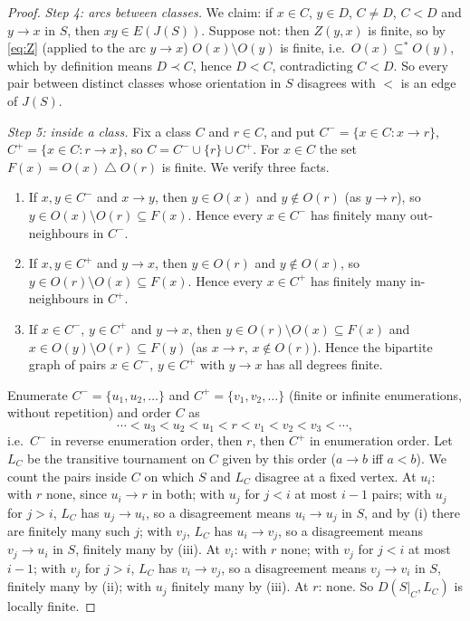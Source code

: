 \documentclass[11pt,a4paper]{article}
\theoremstyle{plain}
\theoremstyle{definition}
\theoremstyle{remark}
\providecommand{\tightlist}{\setlength{\itemsep}{0pt}\setlength{\parskip}{0pt}}
\newcommand{\fin}{\subseteq^{\ast}}
\newcommand{\symdiff}{\mathbin{\triangle}}
\begin{document}
\begin{proof}
\emph{Step 4: arcs between classes.} We claim: if $x\in C$, $y\in D$, $C\ne D$, $C<D$ and $y\to x$ in $S$, then $xy\in E(J(S))$. Suppose not: then $Z(y,x)$ is finite, so by \eqref{eq:Z} (applied to the arc $y\to x$) $O(x)\setminus O(y)$ is finite, i.e.\ $O(x)\fin O(y)$, which by definition means $D\prec C$, hence $D<C$, contradicting $C<D$. So every pair between distinct classes whose orientation in $S$ disagrees with $<$ is an edge of $J(S)$.

\emph{Step 5: inside a class.} Fix a class $C$ and $r\in C$, and put $C^-=\{x\in C: x\to r\}$, $C^+=\{x\in C: r\to x\}$, so $C=C^-\cup\{r\}\cup C^+$. For $x\in C$ the set $F(x)=O(x)\symdiff O(r)$ is finite. We verify three facts.
\begin{enumerate}[label=(\roman*)]\tightlist
\item If $x,y\in C^-$ and $x\to y$, then $y\in O(x)$ and $y\notin O(r)$ (as $y\to r$), so $y\in O(x)\setminus O(r)\subseteq F(x)$. Hence every $x\in C^-$ has finitely many out-neighbours in $C^-$.
\item If $x,y\in C^+$ and $y\to x$, then $y\in O(r)$ and $y\notin O(x)$, so $y\in O(r)\setminus O(x)\subseteq F(x)$. Hence every $x\in C^+$ has finitely many in-neighbours in $C^+$.
\item If $x\in C^-$, $y\in C^+$ and $y\to x$, then $y\in O(r)\setminus O(x)\subseteq F(x)$ and $x\in O(y)\setminus O(r)\subseteq F(y)$ (as $x\to r$, $x\notin O(r)$). Hence the bipartite graph of pairs $x\in C^-$, $y\in C^+$ with $y\to x$ has all degrees finite.
\end{enumerate}
Enumerate $C^-=\{u_1,u_2,\dots\}$ and $C^+=\{v_1,v_2,\dots\}$ (finite or infinite enumerations, without repetition) and order $C$ as
\begin{equation}\label{eq:classorder}
 \cdots<u_3<u_2<u_1<r<v_1<v_2<v_3<\cdots,
\end{equation}
i.e.\ $C^-$ in reverse enumeration order, then $r$, then $C^+$ in enumeration order. Let $L_C$ be the transitive tournament on $C$ given by this order ($a\to b$ iff $a<b$). We count the pairs inside $C$ on which $S$ and $L_C$ disagree at a fixed vertex. At $u_i$: with $r$ none, since $u_i\to r$ in both; with $u_j$ for $j<i$ at most $i-1$ pairs; with $u_j$ for $j>i$, $L_C$ has $u_j\to u_i$, so a disagreement means $u_i\to u_j$ in $S$, and by (i) there are finitely many such $j$; with $v_j$, $L_C$ has $u_i\to v_j$, so a disagreement means $v_j\to u_i$ in $S$, finitely many by (iii). At $v_i$: with $r$ none; with $v_j$ for $j<i$ at most $i-1$; with $v_j$ for $j>i$, $L_C$ has $v_i\to v_j$, so a disagreement means $v_j\to v_i$ in $S$, finitely many by (ii); with $u_j$ finitely many by (iii). At $r$: none. So $D(S|_C,L_C)$ is locally finite.


\end{proof}
\end{document}
